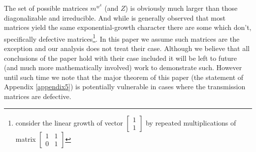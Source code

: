The set of possible matrices $m^{w^k}$ (and $Z$) is obviously much larger than those diagonalizable and irreducible. And while is generally observed that most matrices yield the same exponential-growth character there are some which don't, specifically defective matrices\footnote{consider the linear growth of vector $\begin{bmatrix}1\\1\end{bmatrix}$ by repeated multiplications of matrix $\begin{bmatrix}1 & 1\\0 & 1\end{bmatrix} $}. In this paper we assume such matrices are the exception and our analysis does not treat their case. Although we believe that all conclusions of the paper hold with their case included it will be left to future (and much more mathematically involved) work to demonstrate such. However until such time we note that the major theorem of this paper (the statement of Appendix \ref{appendix5}) is potentially vulnerable in cases where the transmission matrices are defective.
